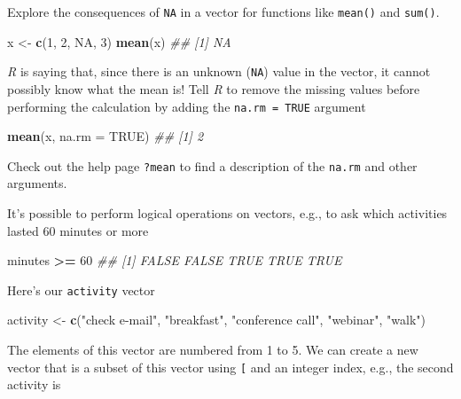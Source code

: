 \documentclass[
]{book}
\newenvironment{Shaded}{\begin{snugshade}}{\end{snugshade}}
\newcommand{\CommentTok}[1]{\textcolor[rgb]{0.56,0.35,0.01}{\textit{#1}}}
\newcommand{\DataTypeTok}[1]{\textcolor[rgb]{0.13,0.29,0.53}{#1}}
\newcommand{\DecValTok}[1]{\textcolor[rgb]{0.00,0.00,0.81}{#1}}
\newcommand{\KeywordTok}[1]{\textcolor[rgb]{0.13,0.29,0.53}{\textbf{#1}}}
\newcommand{\NormalTok}[1]{#1}
\newcommand{\OperatorTok}[1]{\textcolor[rgb]{0.81,0.36,0.00}{\textbf{#1}}}
\newcommand{\OtherTok}[1]{\textcolor[rgb]{0.56,0.35,0.01}{#1}}
\newcommand{\StringTok}[1]{\textcolor[rgb]{0.31,0.60,0.02}{#1}}
\begin{document}
Explore the consequences of \texttt{NA} in a vector for functions like \texttt{mean()} and \texttt{sum()}.

\begin{Shaded}
\begin{Highlighting}[]
\NormalTok{x <-}\StringTok{ }\KeywordTok{c}\NormalTok{(}\DecValTok{1}\NormalTok{, }\DecValTok{2}\NormalTok{, }\OtherTok{NA}\NormalTok{, }\DecValTok{3}\NormalTok{)}
\KeywordTok{mean}\NormalTok{(x)}
\CommentTok{## [1] NA}
\end{Highlighting}
\end{Shaded}

\emph{R} is saying that, since there is an unknown (\texttt{NA}) value in the vector, it cannot possibly know what the mean is! Tell \emph{R} to remove the missing values before performing the calculation by adding the \texttt{na.rm\ =\ TRUE} argument

\begin{Shaded}
\begin{Highlighting}[]
\KeywordTok{mean}\NormalTok{(x, }\DataTypeTok{na.rm =} \OtherTok{TRUE}\NormalTok{)}
\CommentTok{## [1] 2}
\end{Highlighting}
\end{Shaded}

Check out the help page \texttt{?mean} to find a description of the \texttt{na.rm} and other arguments.

It's possible to perform logical operations on vectors, e.g., to ask which activities lasted 60 minutes or more

\begin{Shaded}
\begin{Highlighting}[]
\NormalTok{minutes }\OperatorTok{>=}\StringTok{ }\DecValTok{60}
\CommentTok{## [1] FALSE FALSE  TRUE  TRUE  TRUE}
\end{Highlighting}
\end{Shaded}

Here's our \texttt{activity} vector

\begin{Shaded}
\begin{Highlighting}[]
\NormalTok{activity <-}\StringTok{ }\KeywordTok{c}\NormalTok{(}\StringTok{"check e-mail"}\NormalTok{, }\StringTok{"breakfast"}\NormalTok{, }\StringTok{"conference call"}\NormalTok{, }\StringTok{"webinar"}\NormalTok{, }\StringTok{"walk"}\NormalTok{)}
\end{Highlighting}
\end{Shaded}

The elements of this vector are numbered from 1 to 5. We can create a new vector that is a subset of this vector using \texttt{{[}} and an integer index, e.g., the second activity is
\end{document}
